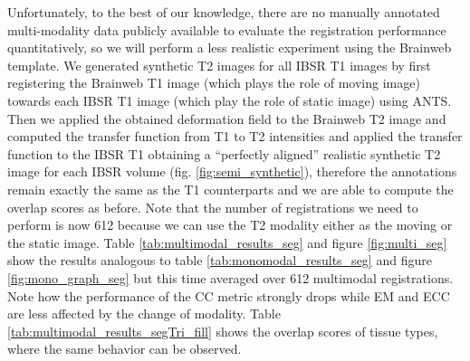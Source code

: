 Unfortunately, to the best of our knowledge, there are no manually annotated multi-modality data publicly available to evaluate the registration performance quantitatively,
so we will perform a less realistic experiment using the Brainweb template. We generated synthetic T2 images for all IBSR T1 images by first registering the Brainweb T1 image (which plays the role of
moving image) towards each IBSR T1 image (which play the role of static image) using ANTS. Then we applied the obtained deformation field to the Brainweb T2 image and computed
the transfer function from T1 to T2 intensities and applied the transfer function to the IBSR T1 obtaining a ``perfectly aligned'' realistic synthetic T2 image for each IBSR volume
(fig. \ref{fig:semi_synthetic}), therefore the annotations remain exactly the same as the T1 counterparts and we are able to compute the overlap scores as before. Note that the number
of registrations we need to perform is now 612 because we can use the T2 modality either as the moving or the static image. Table \ref{tab:multimodal_results_seg} and
figure \ref{fig:multi_seg} show the results analogous to table \ref{tab:monomodal_results_seg} and figure \ref{fig:mono_graph_seg} but this time averaged over 612
multimodal registrations. Note how the performance of the CC metric strongly drops while EM and ECC are less affected by the change of modality. Table
\ref{tab:multimodal_results_segTri_fill} shows the overlap scores of tissue types, where the same behavior can be observed.\\

